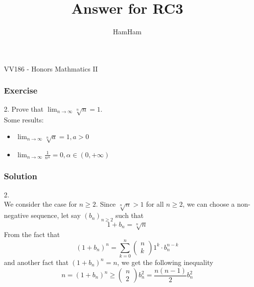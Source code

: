 \documentclass{beamer}
\title{\sffamily Answer for RC3}
\institute[UM-SJTU JI]{University of Michigan-Shanghai Jiao Tong University Joint Institute}
\author{HamHam}
\newcommand{\myfont}{\rmfamily\normalsize\upshape\mdseries}
\begin{document}
\begin{titlepage}
    \begin{center}
        VV186 - Honors Mathmatics II
    \end{center}
\end{titlepage}
\myfont

    \begin{frame}
        \frametitle{Exercise}
        2. Prove that $\lim_{n\rightarrow \infty} \sqrt[n]{n}=1$.\\ 
        \vspace{3em}
        Some results:
        \begin{itemize}
            \item $\lim_{n\rightarrow \infty} \sqrt[n]{a}=1,a>0$
            \item $\lim_{n\rightarrow \infty} \frac{1}{n^\alpha}=0,\alpha\in (0,+\infty)$
        \end{itemize}
    \end{frame}
    \begin{frame}
        \frametitle{Solution}
    2.\\
    \hspace{1em} We consider the case for $n\geq 2$. Since $\sqrt[n]{n}>1$ for all $n\geq 2$, we can choose a 
    non-negative sequence, let say $(b_n)_{n\geq 2}$ such that
    \begin{equation*}
        1+b_n=\sqrt[n]{n}
    \end{equation*}
    \hspace{1em} From the fact that 
    \begin{equation*}
        (1+b_n)^n=\sum^n_{k=0}\left(\begin{smallmatrix}n\\k\end{smallmatrix}\right)1^k\cdot b_n^{n-k}
    \end{equation*}
    and another fact that $(1+b_n)^n=n$, we get the following inequality
    \begin{equation*}
        n=(1+b_n)^n\geq \left(\begin{smallmatrix}n \\ 2\end{smallmatrix}\right) b^2_n=\frac{n(n-1)}{2}b^2_n
    \end{equation*}
    \end{frame}
    
\end{document}

